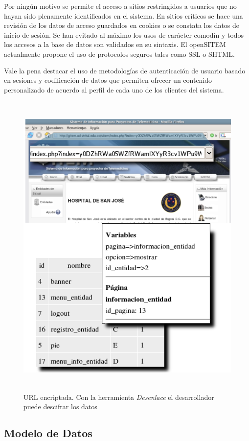 Por ningún motivo se permite el acceso a sitios restringidos a usuarios que no hayan sido plenamente identificados en el sistema. En sitios críticos se hace una revisión de los datos de acceso guardados en cookies o se constata los datos de inicio de sesión. Se han evitado al máximo los usos de carácter comodín y todos los accesos a la base de datos son validados en su sintaxis. El openSITEM actualmente propone el uso de protocolos seguros tales como SSL o SHTML.

Vale la pena destacar el uso de metodologías de autenticación de usuario basado en sesiones y codificación de datos que permiten ofrecer un contenido personalizado de acuerdo al perfil de cada uno de los clientes del sistema.

\begin{figure}
 \centering
 \includegraphics[width=156mm, height=156mm]{desenlace.png}
 \caption{URL encriptada. Con la herramienta \textit{Desenlace} el desarrollador puede descifrar los datos}
 \label{desenlace}
\end{figure}


\subsection{Modelo de Datos}

